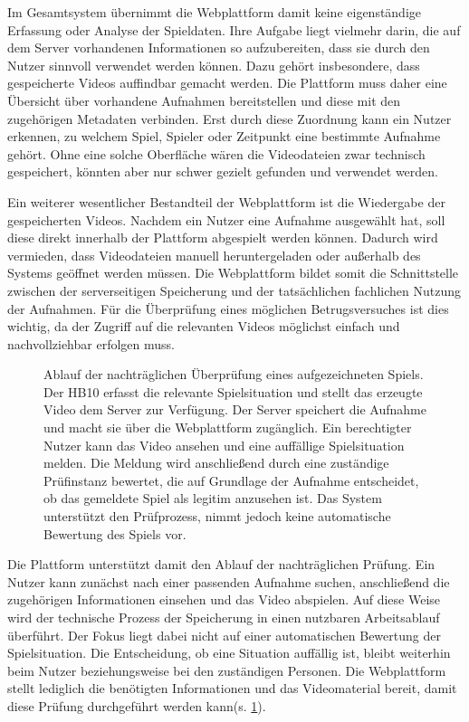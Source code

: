 Im Gesamtsystem übernimmt die Webplattform damit keine eigenständige Erfassung oder Analyse der Spieldaten. Ihre Aufgabe liegt vielmehr darin, die auf dem Server vorhandenen Informationen so aufzubereiten, dass sie durch den Nutzer sinnvoll verwendet werden können. Dazu gehört insbesondere, 
dass gespeicherte Videos auffindbar gemacht werden. Die Plattform muss daher eine Übersicht über vorhandene Aufnahmen bereitstellen und diese mit den zugehörigen Metadaten verbinden. Erst durch diese Zuordnung kann ein Nutzer erkennen, zu welchem Spiel, Spieler oder Zeitpunkt eine bestimmte Aufnahme gehört. 
Ohne eine solche Oberfläche wären die Videodateien zwar technisch gespeichert, könnten aber nur schwer gezielt gefunden und verwendet werden. 

Ein weiterer wesentlicher Bestandteil der Webplattform ist die Wiedergabe der gespeicherten Videos. Nachdem ein Nutzer eine Aufnahme ausgewählt hat, soll diese direkt innerhalb der Plattform abgespielt werden können. Dadurch wird vermieden, 
dass Videodateien manuell heruntergeladen oder außerhalb des Systems geöffnet werden müssen. Die Webplattform bildet somit die Schnittstelle zwischen der serverseitigen Speicherung und der tatsächlichen fachlichen Nutzung der Aufnahmen. Für die Überprüfung eines möglichen Betrugsversuches ist dies wichtig, 
da der Zugriff auf die relevanten Videos möglichst einfach und nachvollziehbar erfolgen muss. 

\begin{figure}[h]
    \centering
    
    \caption[Ablauf der nachträglichen Spielüberprüfung]{Ablauf der nachträglichen Überprüfung eines aufgezeichneten Spiels. Der HB10 erfasst die relevante Spielsituation und stellt das erzeugte Video dem Server zur Verfügung. Der Server speichert die Aufnahme und macht sie über die Webplattform zugänglich. 
    Ein berechtigter Nutzer kann das Video ansehen und eine auffällige Spielsituation melden. Die Meldung wird anschließend durch eine zuständige Prüfinstanz bewertet, die auf Grundlage der Aufnahme entscheidet, ob das gemeldete Spiel als legitim anzusehen ist. Das System unterstützt den Prüfprozess, 
    nimmt jedoch keine automatische Bewertung des Spiels vor.}
    \label{fig:cheatdet}
\end{figure}

Die Plattform unterstützt damit den Ablauf der nachträglichen Prüfung. Ein Nutzer kann zunächst nach einer passenden Aufnahme suchen, anschließend die zugehörigen Informationen einsehen und das Video abspielen. 
Auf diese Weise wird der technische Prozess der Speicherung in einen nutzbaren Arbeitsablauf überführt. Der Fokus liegt dabei nicht auf einer automatischen Bewertung der Spielsituation. Die Entscheidung, ob eine Situation auffällig ist, bleibt weiterhin beim Nutzer beziehungsweise bei den zuständigen Personen. 
Die Webplattform stellt lediglich die benötigten Informationen und das Videomaterial bereit, damit diese Prüfung durchgeführt werden kann(s. \cref{fig:cheatdet}).

